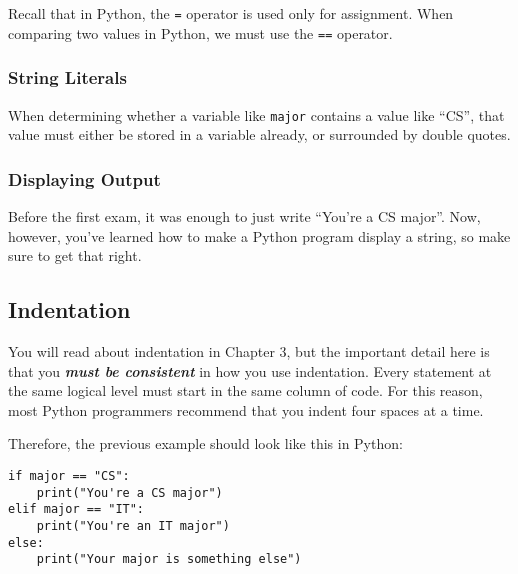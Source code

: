 Recall that in Python, the \texttt{=} operator is used only for assignment.  When comparing two values in Python, we must use the \texttt{==} operator.

\subsubsection{String Literals}

When determining whether a variable like \texttt{major} contains a value like ``CS'', that value must either be stored in a variable already, or surrounded by double quotes.

\subsubsection{Displaying Output}

Before the first exam, it was enough to just write ``You're a CS major''.  Now, however, you've learned how to make a Python program display a string, so make sure to get that right.

\subsection{Indentation}

You will read about indentation in Chapter 3, but the important detail here is that you \textbf{\textit{must be consistent}} in how you use indentation.  Every statement at the same logical level must start in the same column of code.  For this reason, most Python programmers recommend that you indent four spaces at a time.

Therefore, the previous example should look like this in Python:

\begin{verbatim}
if major == "CS":
    print("You're a CS major")
elif major == "IT":
    print("You're an IT major")
else:
    print("Your major is something else")
\end{verbatim}